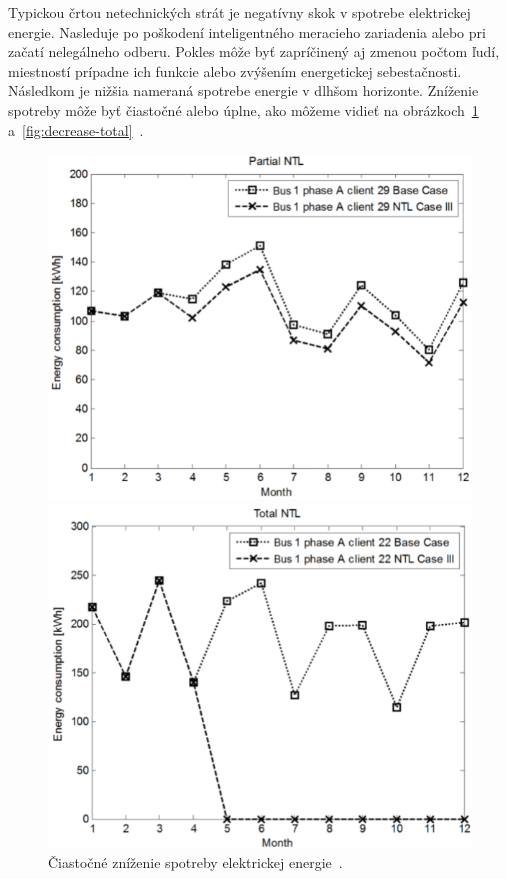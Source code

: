 \documentclass[a4paper,twoside,slovak,12pt,appendix]{article}
\begin{document}
Typickou črtou netechnických strát je negatívny skok v spotrebe elektrickej
energie. Nasleduje po poškodení inteligentného meracieho zariadenia alebo pri
začatí nelegálneho odberu. Pokles môže byť zapríčinený aj zmenou počtom ľudí,
miestností prípadne ich funkcie alebo zvýšením energetickej sebestačnosti.
Následkom je nižšia nameraná spotrebe energie v dlhšom horizonte. Zníženie
spotreby môže byť čiastočné alebo úplne, ako môžeme
vidieť na obrázkoch~\ref{fig:decrease-partial}
a~\ref{fig:decrease-total}~\cite{Spiric2015,Trevizan2015}.

\begin{figure}[]

	\begin{minipage}{0.45\textwidth}
		\begin{center}
			\includegraphics[scale=0.33]{decrease-partial.png}
			\caption{Čiastočné zníženie spotreby elektrickej energie~\cite{Trevizan2015}.}
			\label{fig:decrease-partial}
		\end{center}
	\end{minipage}
  \centering
  \begin{minipage}{0.45\textwidth}
    \begin{center}
      \includegraphics[scale=0.33]{decrease-total.png}

\end{center}
\end{minipage}
\end{figure}
\end{document}
